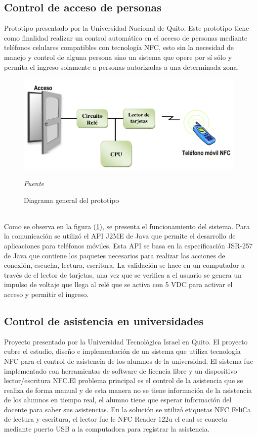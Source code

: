 \documentclass[11pt,openany]{book}
\begin{document}
	\subsection{Control de acceso de personas\cite{Cherrez2010}}
	Prototipo presentado por la Universidad Nacional de Quito. Este prototipo tiene como finalidad realizar un control automático en el acceso de personas mediante teléfonos celulares compatibles con tecnología NFC, esto sin la necesidad de manejo y control de alguna persona sino un sistema que opere por sí sólo y permita el ingreso solamente a personas autorizadas a una determinada zona.\\
	\begin{figure}[htb]
			\centering
			\includegraphics[scale = 0.5]{imagenes/control_acceso.PNG}
			\caption{Diagrama general del prototipo}
			\textsl{Fuente }\cite{Cherrez2010}
			\label{Diagrama_del_prototipo}
	\end{figure} \\
	Como se observa en la figura (\ref{Diagrama_del_prototipo}), se presenta el funcionamiento del sistema. Para la comunicación se utilizó el API J2ME de Java que permite el desarrollo de aplicaciones para teléfonos móviles. Esta API se basa en la especificación JSR-257 de Java que contiene los paquetes necesarios para realizar las acciones de conexión, escucha, lectura, escritura. La validación se hace en un computador a través de el lector de tarjetas, una vez que se verifica a el usuario se genera un impulso de voltaje que llega al relé que se activa con 5 VDC para activar el acceso y permitir el ingreso.

	\subsection{Control de asistencia en universidades \cite{Chulde2014} }
	Proyecto presentado por la Universidad Tecnológica Israel en Quito. El proyecto cubre el estudio, diseño e implementación de un sistema que utiliza tecnología NFC para el control de asistencia de los alumnos de la universidad. El sistema fue implementado con herramientas de software de licencia libre y un dispositivo lector/escritura NFC.El problema principal es el control de la asistencia que se realiza de forma manual y de esta manera no se tiene información de la asistencia de los alumnos en tiempo real, el alumno tiene que esperar información del docente para saber sus asistencias. En la solución se utilizó etiquetas NFC FeliCa de lectura y escritura, el lector fue le NFC Reader 122u el cual se conecta mediante puerto USB a la computadora para registrar la asistencia.\\
\end{document}
